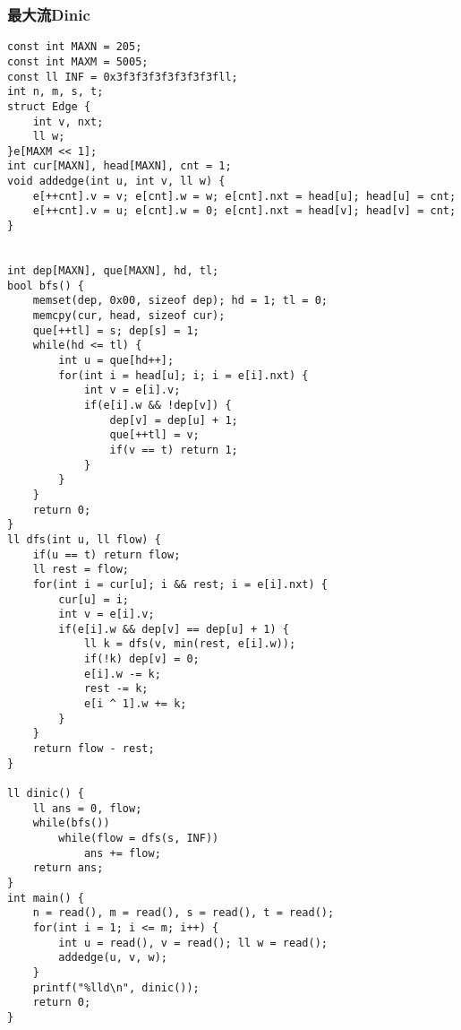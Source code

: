 \documentclass{article}
\begin{document}
\subsubsection{最大流Dinic}
\begin{lstlisting}
const int MAXN = 205;
const int MAXM = 5005;
const ll INF = 0x3f3f3f3f3f3f3f3fll;
int n, m, s, t;
struct Edge {
	int v, nxt;
	ll w;
}e[MAXM << 1];
int cur[MAXN], head[MAXN], cnt = 1;
void addedge(int u, int v, ll w) {
	e[++cnt].v = v; e[cnt].w = w; e[cnt].nxt = head[u]; head[u] = cnt;
	e[++cnt].v = u; e[cnt].w = 0; e[cnt].nxt = head[v]; head[v] = cnt;
}


int dep[MAXN], que[MAXN], hd, tl;
bool bfs() {
	memset(dep, 0x00, sizeof dep); hd = 1; tl = 0;
	memcpy(cur, head, sizeof cur);
	que[++tl] = s; dep[s] = 1;
	while(hd <= tl) {
		int u = que[hd++];
		for(int i = head[u]; i; i = e[i].nxt) {
			int v = e[i].v;
			if(e[i].w && !dep[v]) {
				dep[v] = dep[u] + 1;
				que[++tl] = v;
				if(v == t) return 1;
			}
		}
	}
	return 0;
}
ll dfs(int u, ll flow) {
	if(u == t) return flow;
	ll rest = flow;
	for(int i = cur[u]; i && rest; i = e[i].nxt) {
		cur[u] = i;
		int v = e[i].v;
		if(e[i].w && dep[v] == dep[u] + 1) {
			ll k = dfs(v, min(rest, e[i].w));
			if(!k) dep[v] = 0;
			e[i].w -= k;
			rest -= k;
			e[i ^ 1].w += k;
		}
	}
	return flow - rest;
}

ll dinic() {
	ll ans = 0, flow;
	while(bfs())
		while(flow = dfs(s, INF))
			ans += flow;
	return ans;
}
int main() {
	n = read(), m = read(), s = read(), t = read();
	for(int i = 1; i <= m; i++) {
		int u = read(), v = read(); ll w = read();
		addedge(u, v, w);
	}
	printf("%lld\n", dinic());
	return 0;
}
\end{lstlisting}
\end{document}
